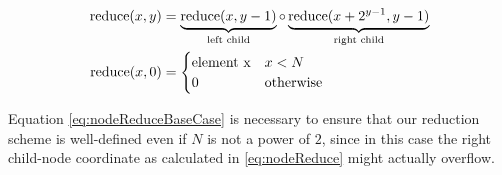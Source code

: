 \begin{align}
\operatorname{reduce} (x, y) &= \underbrace{\operatorname{reduce} (x, y - 1)}_{\textrm{left child}}
\operatorname{\circ} \underbrace{\operatorname{reduce} (x + 2^{y - 1}, y - 1)}_{\textrm{right child}} \label{eq:nodeReduce} \\
\operatorname{reduce} (x, 0) &= \begin{cases}
\textrm{element x} & x < N \\
0 & \textrm{otherwise}
\end{cases}
\label{eq:nodeReduceBaseCase}
\end{align}

Equation \eqref{eq:nodeReduceBaseCase} is necessary to ensure that our reduction scheme is well-defined even if $N$ is not a power of $2$,
since in this case the right child-node coordinate as calculated in \eqref{eq:nodeReduce} might actually overflow.

